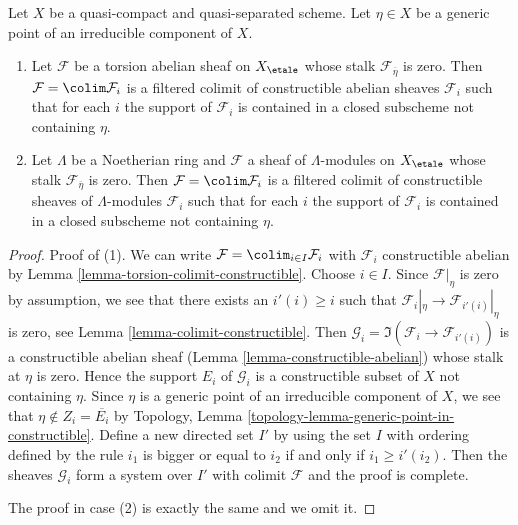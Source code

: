 \begin{lemma}
\label{lemma-zero-in-generic-point}
Let $X$ be a quasi-compact and quasi-separated scheme. Let
$\eta \in X$ be a generic point of an irreducible component of $X$.
\begin{enumerate}
\item Let $\mathcal{F}$ be a torsion abelian sheaf on $X_\etale$
whose stalk $\mathcal{F}_{\overline{\eta}}$ is zero.
Then $\mathcal{F} = \colim \mathcal{F}_i$ is a filtered colimit of
constructible abelian sheaves $\mathcal{F}_i$ such that for each $i$
the support of $\mathcal{F}_i$ is contained
in a closed subscheme not containing $\eta$.
\item Let $\Lambda$ be a Noetherian ring and $\mathcal{F}$ a sheaf
of $\Lambda$-modules on $X_\etale$ whose stalk
$\mathcal{F}_{\overline{\eta}}$ is zero. Then
$\mathcal{F} = \colim \mathcal{F}_i$
is a filtered colimit of constructible sheaves of
$\Lambda$-modules $\mathcal{F}_i$ such that for each $i$
the support of $\mathcal{F}_i$ is contained in a closed subscheme
not containing $\eta$.
\end{enumerate}
\end{lemma}

\begin{proof}
Proof of (1). We can write $\mathcal{F} = \colim_{i \in I} \mathcal{F}_i$
with $\mathcal{F}_i$ constructible abelian by
Lemma \ref{lemma-torsion-colimit-constructible}.
Choose $i \in I$. Since $\mathcal{F}|_\eta$ is zero by assumption, we
see that there exists an $i'(i) \geq i$ such that
$\mathcal{F}_i|_\eta \to \mathcal{F}_{i'(i)}|_\eta$ is zero, see
Lemma \ref{lemma-colimit-constructible}.
Then $\mathcal{G}_i = \Im(\mathcal{F}_i \to \mathcal{F}_{i'(i)})$
is a constructible abelian sheaf (Lemma \ref{lemma-constructible-abelian})
whose stalk at $\eta$ is zero.
Hence the support $E_i$ of $\mathcal{G}_i$ is a constructible
subset of $X$ not containing $\eta$. Since
$\eta$ is a generic point of an irreducible component of
$X$, we see that $\eta \not \in Z_i = \overline{E_i}$ by
Topology, Lemma \ref{topology-lemma-generic-point-in-constructible}.
Define a new directed set $I'$ by using the set $I$ with
ordering defined by the rule
$i_1$ is bigger or equal to $i_2$ if and only if $i_1 \geq i'(i_2)$.
Then the sheaves $\mathcal{G}_i$ form a system over $I'$
with colimit $\mathcal{F}$ and the proof is complete.

\medskip\noindent
The proof in case (2) is exactly the same and we omit it.
\end{proof}








